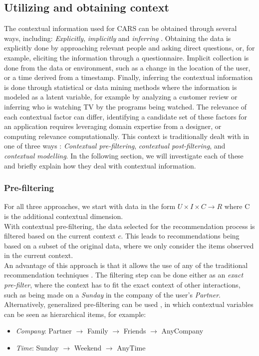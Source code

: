 \subsection{Utilizing and obtaining context}
The contextual information used for CARS can be obtained through several ways, including: \textit{Explicitly}, \textit{implicitly} and \textit{inferring} \cite{RecommenderHandbook2015}.
Obtaining the data is explicitly done by approaching relevant people and asking direct questions, or, for example, eliciting the information through a questionnaire.
Implicit collection is done from the data or environment, such as a change in the location of the user, or a time derived from a timestamp.
Finally, inferring the contextual information is done through statistical or data mining methods where the information is modeled as a latent variable, for example by analyzing a customer review or inferring who is watching TV by the programs being watched.
The relevance of each contextual factor can differ, identifying a candidate set of these factors for an application requires leveraging domain expertise from a designer, or computing relevance computationally.
This context is traditionally dealt with in one of three ways \cite{Adomavicius2011}: \textit{Contextual pre-filtering}, \textit{contextual post-filtering}, and \textit{contextual modelling}.
In the following section, we will investigate each of these and briefly explain how they deal with contextual information.

\subsubsection*{Pre-filtering}
For all three approaches, we start with data in the form $U \times I \times C \rightarrow R$ where C is the additional contextual dimension.\\
With contextual pre-filtering, the data selected for the recommendation process is filtered based on the current context $c$.
This leads to recommendations being based on a subset of the original data, where we only consider the items observed in the current context.\\
An advantage of this approach is that it allows the use of any of the traditional recommendation techniques \cite{Adomavicius2011}.
The filtering step can be done either as an \textit{exact pre-filter}, where the context has to fit the exact context of other interactions, such as being made on a \textit{Sunday} in the company of the user's \textit{Partner}.
Alternatively, generalized pre-filtering can be used \cite{Adomavicius2011}, in which contextual variables can be seen as hierarchical items, for example:
\begin{itemize}
	\item \textit{Company}: Partner $\rightarrow$ Family $\rightarrow$ Friends $\rightarrow$ AnyCompany
	\item \textit{Time}: Sunday $\rightarrow$ Weekend $\rightarrow$ AnyTime
\end{itemize}


